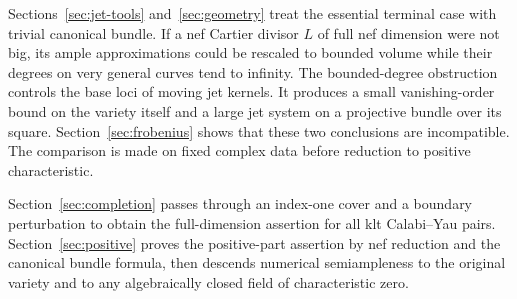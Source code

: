 Sections~\ref{sec:jet-tools} and~\ref{sec:geometry} treat the essential
terminal case with trivial canonical bundle. If a nef Cartier divisor
$L$ of full nef dimension were not big, its ample approximations could
be rescaled to bounded volume while their degrees on very general
curves tend to infinity. The bounded-degree obstruction controls the
base loci of moving jet kernels. It produces a small vanishing-order
bound on the variety itself and a large jet system on a projective
bundle over its square. Section~\ref{sec:frobenius} shows that these two
conclusions are incompatible. The comparison is made on fixed complex
data before reduction to positive characteristic.

Section~\ref{sec:completion} passes through an index-one cover and a
boundary perturbation to obtain the full-dimension assertion for all
klt Calabi--Yau pairs. Section~\ref{sec:positive} proves the
positive-part assertion by nef reduction and the canonical bundle
formula, then descends numerical semiampleness to the original variety
and to any algebraically closed field of characteristic zero.
